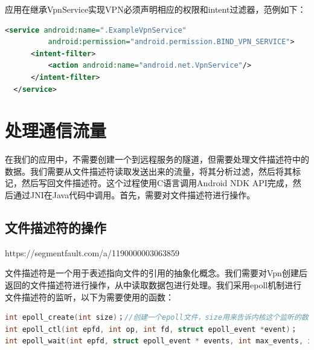 \documentclass[format=final, language=chinese, degree=fyp]{hustthesis}
\begin{document}
 应用在继承VpnService实现VPN必须声明相应的权限和intent过滤器，范例如下：
\begin{lstlisting}[language=xml]
  <service android:name=".ExampleVpnService"
          android:permission="android.permission.BIND_VPN_SERVICE">
      <intent-filter>
          <action android:name="android.net.VpnService"/>
      </intent-filter>
  </service>
\end{lstlisting}


\section{处理通信流量}

在我们的应用中，不需要创建一个到远程服务的隧道，但需要处理文件描述符中的数据。我们需要从文件描述符读取发送出来的流量，将其分析过滤，然后将其标记，然后写回文件描述符。这个过程使用C语言调用Android NDK API完成，然后通过JNI在Java代码中调用。首先，需要对文件描述符进行操作。

\subsection{文件描述符的操作}

https://segmentfault.com/a/1190000003063859

文件描述符是一个用于表述指向文件的引用的抽象化概念。我们需要对Vpn创建后返回的文件描述符进行操作，从中读取数据包进行处理。我们采用epoll机制进行文件描述符的监听，以下为需要使用的函数：

\begin{lstlisting}[language=c]
int epoll_create(int size)；//创建一个epoll文件，size用来告诉内核这个监听的数目一共有多大
int epoll_ctl(int epfd, int op, int fd, struct epoll_event *event)；
int epoll_wait(int epfd, struct epoll_event * events, int max_events, int timeout);
\end{lstlisting}
\end{document}
